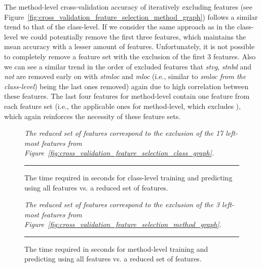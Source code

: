 The method-level cross-validation accuracy of iteratively excluding features (see Figure~\ref{fig:cross_validation_feature_selection_method_graph}) follows a similar trend to that of the class-level. If we consider the same approach as in the class-level we could potentially remove the first three features, which maintains the mean accuracy with a lesser amount of features. Unfortunately, it is not possible to completely remove a feature set with the exclusion of the first 3 features. Also we can see a similar trend in the order of excluded features that \emph{stvg}, \emph{stnbd} and \emph{not} are removed early on with \emph{stmloc} and \emph{mloc} (i.e., similar to \emph{smloc from the class-level}) being the last ones removed) again due to high correlation between these features. The last four features for method-level contain one feature from each feature set (i.e., the applicable ones for method-level, which excludes ), which again reinforces the necessity of these feature sets.

\begin{figure}[ht!]
  \centering
  \begin{adjustbox}{max size={.95\textwidth}{.95\textheight}}
    
  \end{adjustbox}
  \caption{The time required in seconds for class-level training and predicting using all features vs. a reduced set of features.}  \vspace{1mm}
  \footnotesize{\emph{The reduced set of features correspond to the exclusion of the 17 left-most features from Figure~\ref{fig:cross_validation_feature_selection_class_graph}.}}
  \vspace{2mm}
  \hrule
  \label{fig:class_train_prediction_default_time_graph}
\end{figure}

\begin{figure}[ht!]
  \centering
  \begin{adjustbox}{max size={.95\textwidth}{.95\textheight}}
    
  \end{adjustbox}
  \caption{The time required in seconds for method-level training and predicting using all features vs. a reduced set of features.}
  \vspace{1mm}
  \footnotesize{\emph{The reduced set of features correspond to the exclusion of the 3 left-most features from Figure~\ref{fig:cross_validation_feature_selection_method_graph}.}}
  \vspace{2mm}
  \hrule
  \label{fig:method_train_prediction_default_time_graph}
\end{figure}

